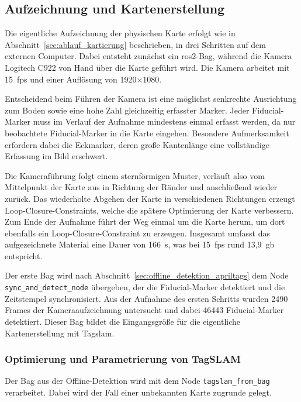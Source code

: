 \subsection{Aufzeichnung und Kartenerstellung}
\label{sec:aufnahme_karte}
Die eigentliche Aufzeichnung der physischen Karte erfolgt wie in Abschnitt~\ref{sec:ablauf_kartierung} beschrieben, in drei Schritten auf dem externen Computer.
Dabei entsteht zunächst ein \gls{ros2}-Bag, während die Kamera Logitech C922 von Hand über die Karte geführt wird.
Die Kamera arbeitet mit 15~\gls{fps} und einer Auflösung von 1920$\times$1080.

Entscheidend beim Führen der Kamera ist eine möglichst senkrechte Ausrichtung zum Boden sowie eine hohe Zahl gleichzeitig erfasster Marker.
Jeder Fiducial-Marker muss im Verlauf der Aufnahme mindestens einmal erfasst werden, da nur beobachtete Fiducial-Marker in die Karte eingehen.
Besondere Aufmerksamkeit erfordern dabei die Eckmarker, deren große Kantenlänge eine vollständige Erfassung im Bild erschwert.

Die Kameraführung folgt einem sternförmigen Muster, verläuft also vom Mittelpunkt der Karte aus in Richtung der Ränder und anschließend wieder zurück.
Das wiederholte Abgehen der Karte in verschiedenen Richtungen erzeugt Loop-Closure-Constraints, welche die spätere Optimierung der Karte verbessern.
Zum Ende der Aufnahme führt der Weg einmal um die Karte herum, um dort ebenfalls ein Loop-Closure-Constraint zu erzeugen.
Insgesamt umfasst das aufgezeichnete Material eine Dauer von 166~s, was bei 15~\gls{fps} rund 13,9~\gls{gb} entspricht.


Der erste Bag wird nach Abschnitt~\ref{sec:offline_detektion_apriltags} dem Node \texttt{sync\_and\_detect\_node} übergeben, der die Fiducial-Marker detektiert und die Zeitstempel synchronisiert.
Aus der Aufnahme des ersten Schritts wurden 2490 Frames der Kameraaufzeichnung untersucht und dabei 46443 Fiducial-Marker detektiert.
Dieser Bag bildet die Eingangsgröße für die eigentliche Kartenerstellung mit Tag\gls{slam}.




\subsubsection*{Optimierung und Parametrierung von TagSLAM}
\label{sec:parametrierung_tagslam}
Der Bag aus der Offline-Detektion wird mit dem Node \texttt{tagslam\_from\_bag} verarbeitet.
Dabei wird der Fall einer unbekannten Karte zugrunde gelegt.

